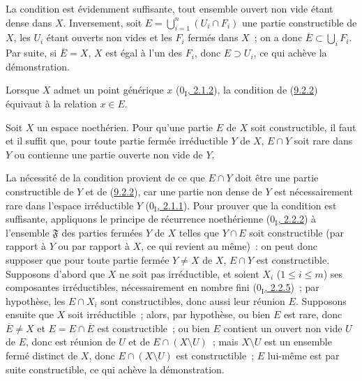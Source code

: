 La condition est évidemment suffisante, tout ensemble ouvert non vide étant
dense dans $X$. Inversement, soit
$E=\bigcup_{i=1}^n(U_i\cap F_i)$ une partie constructible de $X$, les $U_i$
étant ouverts non vides et les $F_i$ fermés dans $X$~; on a donc
$\overline{E}\subset\bigcup_i F_i$. Par suite, si $\overline{E}=X$, $X$ est
égal à l'un des $F_i$, donc $E\supset U_i$, ce qui achève la démonstration.

Lorsque $X$ admet un point générique $x$
(\hyperref[0.2.1.2-fr]{$0_{\mathrm I}$, 2.1.2}), la condition de
(\hyperref[0.9.2.2-fr]{9.2.2}) équivaut à la relation $x\in E$.

\begin{proposition}[9.2.3]
\label{0.9.2.3-fr}
Soit $X$ un espace noethérien. Pour qu'une partie $E$ de $X$ soit
constructible, il faut et il suffit que, pour toute partie fermée
irréductible $Y$ de $X$, $E\cap Y$ soit rare dans $Y$ ou contienne une partie
ouverte non vide de $Y$.
\end{proposition}

La nécessité de la condition provient de ce que $E\cap Y$ doit être une
partie constructible de $Y$ et de (\hyperref[0.9.2.2-fr]{9.2.2}), car une
partie non dense de $Y$ est nécessairement rare dans l'espace irréductible
$Y$ (\hyperref[0.2.1.1-fr]{$0_{\mathrm I}$, 2.1.1}). Pour prouver que la
condition est suffisante, appliquons le principe de récurrence noethérienne
(\hyperref[0.2.2.2-fr]{$0_{\mathrm I}$, 2.2.2}) à l'ensemble
$\mathfrak{F}$ des parties fermées $Y$ de $X$ telles que $Y\cap E$ soit
constructible (par rapport à $Y$ ou par rapport à $X$, ce qui revient au
même)~: on peut donc supposer que pour toute partie fermée $Y\ne X$ de $X$,
$E\cap Y$ est constructible. Supposons d'abord que $X$ ne soit pas
irréductible, et soient $X_i$ ($1\leq i\leq m$) ses composantes
irréductibles, nécessairement en nombre fini
(\hyperref[0.2.2.5-fr]{$0_{\mathrm I}$, 2.2.5})~; par hypothèse, les
$E\cap X_i$ sont constructibles, donc aussi leur réunion $E$. Supposons
ensuite que $X$ soit irréductible~; alors, par hypothèse, ou bien $E$ est
rare, donc $\overline{E}\ne X$ et $E=E\cap\overline{E}$ est constructible~;
ou bien $E$ contient un ouvert non vide $U$ de $E$, donc est réunion de $U$
et de $E\cap(X\setminus U)$~; mais $X\setminus U$ est un ensemble fermé
distinct de $X$, donc $E\cap(X\setminus U)$ est constructible~; $E$
lui-même est par suite constructible, ce qui achève la démonstration.

